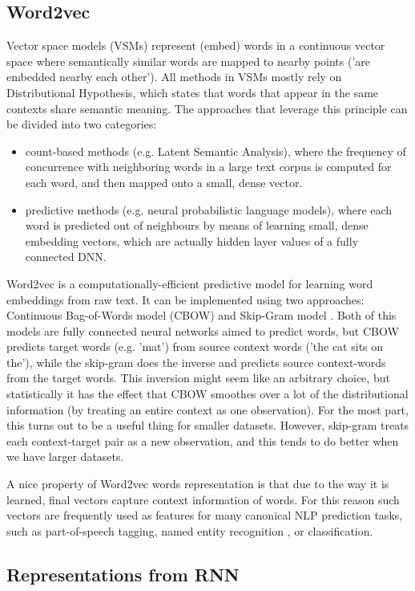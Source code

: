 \subsection{Word2vec}
Vector space models (VSMs) represent (embed) words in a continuous vector space where semantically similar words are mapped to nearby points ('are embedded nearby each other'). All methods in VSMs mostly rely on Distributional Hypothesis, which states that words that appear in the same contexts share semantic meaning. The approaches that leverage this principle can be divided into two categories:
\begin{itemize}
    \item count-based methods (e.g. Latent Semantic Analysis), where  the frequency of concurrence with neighboring words in a large text corpus is computed for each word, and then mapped onto a small, dense vector.
    \item predictive methods (e.g. neural probabilistic language models), where each word is predicted out of neighbours by means of learning small, dense embedding vectors, which are actually hidden layer values of a fully connected DNN. 
\end{itemize}

Word2vec is a computationally-efficient predictive model for learning word embeddings from raw text. It can be implemented using two approaches: Continuous Bag-of-Words model (CBOW) and  Skip-Gram model \cite{Mikolov-ICLR2013}. Both of this models are fully connected neural networks aimed to predict words, but CBOW predicts target words (e.g. 'mat') from source context words ('the cat sits on the'), while the skip-gram does the inverse and predicts source context-words from the target words. This inversion might seem like an arbitrary choice, but statistically it has the effect that CBOW smoothes over a lot of the distributional information (by treating an entire context as one observation). For the most part, this turns out to be a useful thing for smaller datasets. However, skip-gram treats each context-target pair as a new observation, and this tends to do better when we have larger datasets. 

A nice property of Word2vec words representation is that due to the way it is learned, final vectors capture context information of words. For this reason such vectors are frequently used as features for many canonical NLP prediction tasks, such as part-of-speech tagging, named entity recognition \citep{Collobert:DBLP}, or classification.


\subsection{Representations from RNN}

